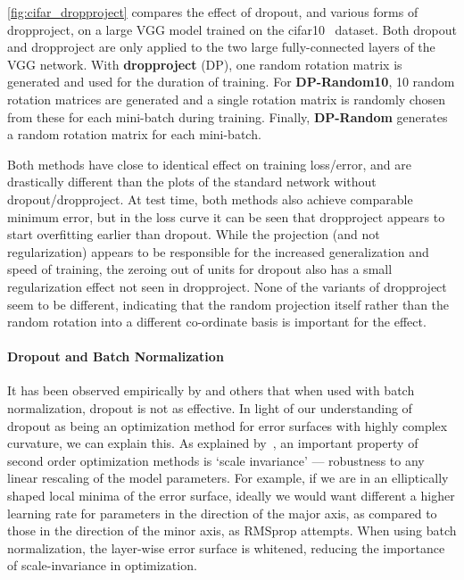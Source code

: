 \documentclass[thesis]{subfiles}
\begin{document}
\cref{fig:cifar_dropproject} compares the effect of dropout, and various forms of dropproject, on a large VGG model trained on the \gls{cifar10}~\citep{CIFAR10} dataset. Both dropout and dropproject are only applied to the two large fully-connected layers of the VGG network. With \textbf{dropproject} (DP), one random rotation matrix is generated and used for the duration of training. For \textbf{DP-Random10}, 10 random rotation matrices are generated and a single rotation matrix is randomly chosen from these for each mini-batch during training. Finally, \textbf{DP-Random} generates a random rotation matrix for each mini-batch.

Both methods have close to identical effect on training loss/error, and are drastically different than the plots of the standard network without dropout/dropproject. At test time, both methods also achieve comparable minimum error, but in the loss curve it can be seen that dropproject appears to start overfitting earlier than dropout. While the projection (and not regularization) appears to be responsible for the increased generalization and speed of training, the zeroing out of units for dropout also has a small regularization effect not seen in dropproject. None of the variants of dropproject seem to be different, indicating that the random projection itself rather than the random rotation into a different co-ordinate basis is important for the effect.

\paragraph{Dropout and Batch Normalization}
It has been observed empirically by \citet{Ioffe2015} and others that when used with batch normalization, dropout is not as effective. In light of our understanding of dropout as being an optimization method for error surfaces with highly complex curvature, we can explain this. As explained by~\citep{martens2010deep}, an important property of second order optimization methods is `scale invariance' --- robustness to any linear rescaling of the model parameters. For example, if we are in an elliptically shaped local minima of the error surface, ideally we would want different a higher learning rate for parameters in the direction of the major axis, as compared to those in the direction of the minor axis, as RMSprop attempts. When using batch normalization, the layer-wise error surface is whitened, reducing the importance of scale-invariance in optimization.

\end{document}
